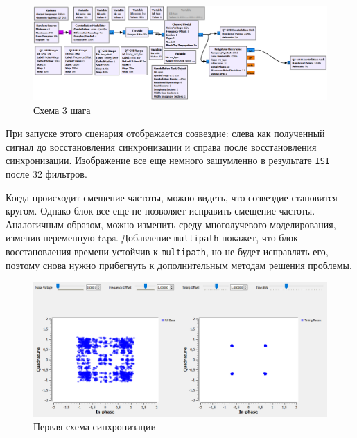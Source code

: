 \documentclass[a4paper]{article}
\begin{document}
            \begin{figure}[H]
                \centering
                \includegraphics[width=\textwidth]{ex_4_1.png}
                \caption{Схема 3 шага}
                \label{fig:ex_4_1}
            \end{figure}
            
            При запуске этого сценария отображается созвездие: слева как полученный сигнал до восстановления синхронизации и справа после восстановления синхронизации. Изображение все еще немного зашумленно в результате \texttt{ISI} после 32 фильтров.
            
            Когда происходит смещение частоты, можно видеть, что созвездие становится кругом. Однако блок все еще не позволяет исправить смещение частоты. Аналогичным образом, можно изменить среду многолучевого моделирования, изменив переменную taps. Добавление \texttt{multipath} покажет, что блок восстановления времени устойчив к \texttt{multipath}, но не будет исправлять его, поэтому снова нужно прибегнуть к дополнительным методам решения проблемы.
            
            \begin{figure}[H]
                \centering
                \includegraphics[width=\textwidth]{ex_4_2.png}
                \caption{Первая схема синхронизации}
                \label{fig:ex_4_2}
            \end{figure}
            
\end{document}
